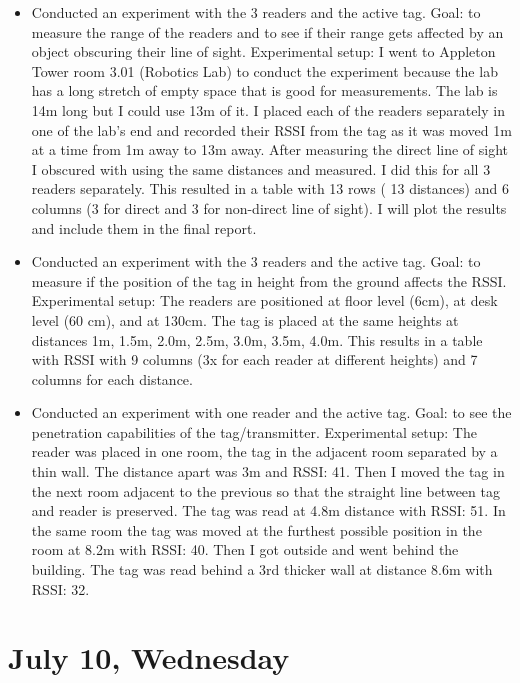 \documentclass[a4paper,12pt]{article}
\begin{document}
\begin{itemize}
	\item Conducted an experiment with the 3 readers and the active tag. Goal: to measure the range of the readers and to see if their range gets affected by an object obscuring their line of sight. Experimental setup: I went to Appleton Tower room 3.01 (Robotics Lab) to conduct the experiment because the lab has a long stretch of empty space that is good for measurements. The lab is 14m long but I could use 13m of it. I placed each of the readers separately in one of the lab's end and recorded their RSSI from the tag as it was moved 1m at a time from 1m away to 13m away. After measuring the direct line of sight I obscured with using the same distances and measured. I did this for all 3 readers separately. This resulted in a table with 13 rows ( 13 distances) and 6 columns (3 for direct and 3 for non-direct line of sight). I will plot the results and include them in the final report.
	\item Conducted an experiment with the 3 readers and the active tag. Goal: to measure if the position of the tag in height from the ground affects the RSSI. Experimental setup: The readers are positioned at floor level (6cm), at desk level (60 cm), and at 130cm. The tag is placed at the same heights at distances 1m, 1.5m, 2.0m, 2.5m, 3.0m, 3.5m, 4.0m. This results in a table with RSSI with 9 columns (3x for each reader at different heights) and 7 columns for each distance.
	\item Conducted an experiment with one reader and the active tag. Goal: to see the penetration capabilities of the tag/transmitter. Experimental setup: The reader was placed in one room, the tag in the adjacent room separated by a thin wall. The distance apart was 3m and RSSI: 41. Then I moved the tag in the next room adjacent to the previous so that the straight line between tag and reader is preserved. The tag was read at 4.8m distance with RSSI: 51. In the same room the tag was moved at the furthest possible position in the room at 8.2m with RSSI: 40. Then I got outside and went behind the building. The tag was read behind a 3rd thicker wall at distance 8.6m with RSSI: 32.
\end{itemize}

\section{July 10, Wednesday}
\end{document}
